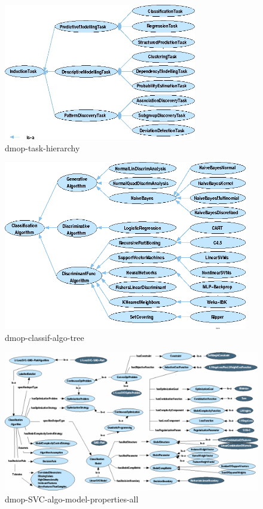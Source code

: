 \documentclass[a4paper,12pt, english]{article}
\begin{document}
\begin{figure}[h]   
  \centering 
  \includegraphics[width=0.75\textwidth]{../figs/dmop-task-hierarchy}
  \caption{dmop-task-hierarchy}
  \label{fig:dmop-task-hierarchy}
\end{figure}


\begin{figure}[h]   
  \centering 
  \includegraphics[width=0.95\textwidth]{../figs/dmop-classif-algo-tree}
  \caption{dmop-classif-algo-tree}
  \label{fig:dmop-classif-algo-tree}
\end{figure}


\newpage
\begin{figure}[h]
  \centering
  \includegraphics[height=0.45\textheight, angle=90]{../figs/dmop-SVC-algo-model-properties-all}
  \caption{dmop-SVC-algo-model-properties-all}
  \label{fig:dmop-classif-algo-tree}
\end{figure}
\end{document}
